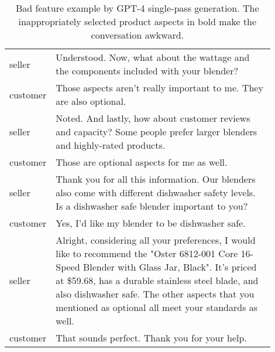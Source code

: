 \begin{table*}[t]
\begin{center}
\begin{tabular}{l p{0.9\linewidth} }
seller& Understood. Now, what about the wattage and the components included with your blender?\\\hdashline
customer& Those aspects aren't really important to me. They are also optional.\\\hdashline
seller& Noted. And lastly, how about customer reviews and capacity? Some people prefer larger blenders and highly-rated products.\\\hdashline
customer& Those are optional aspects for me as well.\\\hdashline
seller& Thank you for all this information. Our blenders also come with different dishwasher safety levels. Is a dishwasher safe blender important to you?\\\hdashline
customer& Yes, I'd like my blender to be dishwasher safe.\\\hdashline
seller& Alright, considering all your preferences, I would like to recommend the "Oster 6812-001 Core 16-Speed Blender with Glass Jar, Black". It's priced at \$59.68, has a durable stainless steel blade, and also dishwasher safe. The other aspects that you mentioned as optional all meet your standards as well.\\\hdashline
customer& That sounds perfect. Thank you for your help.\\
    \hline
    \end{tabular}
    \caption{Bad feature example by GPT-4 single-pass generation. The inappropriately selected product aspects in bold make the conversation awkward.} \label{tab:bad_feature}
\end{center}
\end{table*}


